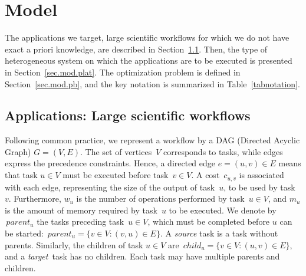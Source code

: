 \documentclass[conference]{IEEEtran}
\newcommand{\parents}[1]{\,parent_{#1}}
\newcommand{\children}[1]{\,child_{#1}}
\newcommand{\skug}[1]{{\color{blue}[SK: #1]}}
\begin{document}
\section{Model} %
\label{sec:model}
%
The applications we target, large scientific workflows for which we do not have exact a priori knowledge,
are described in Section~\ref{sec.mod.work}. Then, the type of heterogeneous system on which
the applications are to be executed is presented in Section~\ref{sec.mod.plat}. The optimization problem
is defined in Section~\ref{sec.mod.pb}, and the key notation is summarized in Table~\ref{tabnotation}.


\subsection{Applications: Large scientific workflows}
\label{sec.mod.work}
%
Following common practice, we represent a workflow by a DAG (Directed Acyclic Graph) 
$G=(V,E)$. The set of vertices~$V$ corresponds to tasks, while edges express the
precedence constraints. Hence, a directed edge $e=(u,v)\in E$ means that task $u\in V$ must be executed 
before task~$v\in V$. A cost~$c_{u,v}$ is associated with each edge, representing the size of the 
output of task~$u$, to be used by task~$v$. 
Furthermore, $w_u$ is the number of operations performed by task~$u\in V$, 
and $m_u$ is the amount of memory required by task~$u$ to be executed. 
We denote by $\parents{u}$ the tasks preceding task~$u\in V$, which must be completed before $u$ can be started:   
$ \parents{u} = \{v \in V: (v,u) \in E\}$. A {\em source} task is a task without parents. %
Similarly, the children of task $u\in V$ are %
$ \children{u} = \{v \in V: (u,v) \in E\}$, and a {\em target} task has no children. 
Each task may have multiple parents and children.
\end{document}
